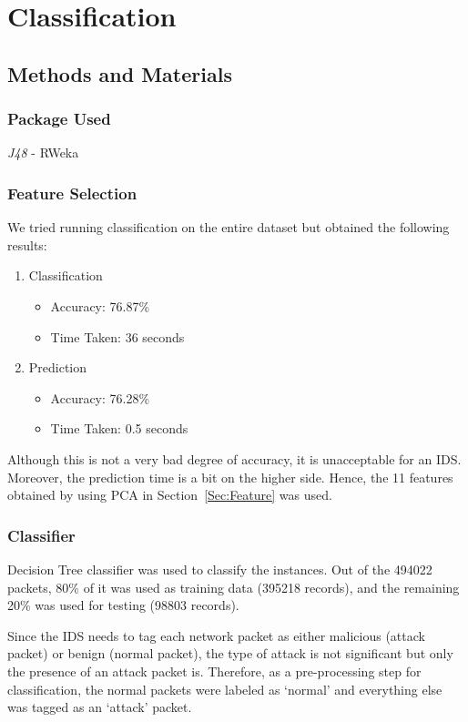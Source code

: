 \documentclass[11pt]{article}
\begin{document}
\section{Classification}
\label{Sec:Class}
\subsection{Methods and Materials}

\subsubsection{Package Used}
{\it J48} - RWeka~\cite{rweka}

\subsubsection{Feature Selection}

We tried running classification on the entire dataset but obtained the following results:
\begin{enumerate}
\item Classification
\begin{itemize}
\item Accuracy: 76.87\%
\item Time Taken: 36 seconds
\end{itemize}
\item Prediction
\begin{itemize}
\item Accuracy: 76.28\%
\item Time Taken: 0.5 seconds
\end{itemize}
\end{enumerate}

Although this is not a very bad degree of accuracy, it is unacceptable for an IDS. Moreover, the prediction time is a bit on the higher side. Hence, the 11 features obtained by using PCA in Section~\ref{Sec:Feature} was used.

\subsubsection{Classifier}
Decision Tree classifier was used to classify the instances. Out of the 494022 packets, 80\% of it was used as training data (395218 records), and the remaining 20\% was used for testing (98803 records).

Since the IDS needs to tag each network packet as either malicious (attack packet) or benign (normal packet), the type of attack is not significant but only the presence of an attack packet is. Therefore, as a pre-processing step for classification, the normal packets were labeled as `normal' and everything else was tagged as an `attack' packet.
\end{document}
